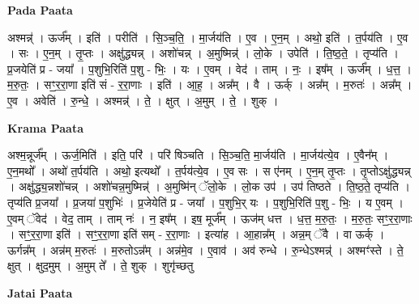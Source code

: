 \documentclass[17pt]{extarticle}
\begin{document}
\textbf{Pada Paata} \newline

अश्मन्न्॑ । ऊर्ज᳚म् । इति॑ । परीति॑ । सि॒ञ्च॒ति॒ । मा॒र्जय॑ति । ए॒व । ए॒न॒म् । अथो॒ इति॑ । त॒र्पय॑ति । ए॒व । सः । ए॒न॒म् । तृ॒प्तः । अक्षु॑द्ध्यन्न् । अशो॑चन्न् । अ॒मुष्मिन्न्॑ । लो॒के । उपेति॑ । ति॒ष्ठ॒ते॒ । तृप्य॑ति । प्र॒जयेति॑ प्र - जया᳚ । प॒शुभि॒रिति॑ प॒शु - भिः॒ । यः । ए॒वम् । वेद॑ । ताम् । नः॒ । इष᳚म् । ऊर्ज᳚म् । ध॒त्त॒ । म॒रु॒तः॒ । सꣳ॒॒र॒रा॒णा इति॑ सं - र॒रा॒णाः । इति॑ । आ॒ह॒ । अन्न᳚म् । वै । ऊर्क् । अन्न᳚म् । म॒रुतः॑ । अन्न᳚म् । ए॒व । अवेति॑ । रु॒न्धे॒ । अश्मन्न्॑ । ते॒ । क्षुत् । अ॒मुम् । ते॒ । शुक् ।  \newline


\textbf{Krama Paata} \newline

अश्म॒न्नूर्ज᳚म् । ऊर्ज॒मिति॑ । इति॒ परि॑ । परि॑ षिञ्चति । सि॒ञ्च॒ति॒ मा॒र्जय॑ति । मा॒र्जय॑त्ये॒व । ए॒वैन᳚म् । ए॒न॒मथो᳚ । अथो॑ त॒र्पय॑ति । अथो॒ इत्यथो᳚ । त॒र्पय॑त्ये॒व । ए॒व सः । स ए॑नम् । ए॒न॒म् तृ॒प्तः । तृ॒प्तोऽक्षु॑द्ध्यन्न् । अक्षु॑द्ध्य॒न्नशो॑चन्न् । अशो॑चन्न॒मुष्मिन्न्॑ । अ॒मुष्मि॑न् ॅलो॒के । लो॒क उप॑ । उप॑ तिष्ठते । ति॒ष्ठ॒ते॒ तृप्य॑ति । तृप्य॑ति प्र॒जया᳚ । प्र॒जया॑ प॒शुभिः॑ । प्र॒जेयेति॑ प्र - जया᳚ । प॒शुभि॒र् यः । प॒शुभि॒रिति॑ प॒शु - भिः॒ । य ए॒वम् । ए॒वम् ॅवेद॑ । वेद॒ ताम् । ताम् नः॑ । न॒ इष᳚म् । इष॒ मूर्ज᳚म् । ऊज॑म् धत्त । ध॒त्त॒ म॒रु॒तः॒ । म॒रु॒तः॒ सꣳ॒॒र॒रा॒णाः । सꣳ॒॒र॒रा॒णा इति॑ । सꣳ॒॒र॒रा॒णा इति॑ सम् - र॒रा॒णाः । इत्या॑ह । आ॒हान्न᳚म् । अन्न॒म् ॅवै । वा ऊर्क् । ऊर्गन्न᳚म् । अन्न॑म् म॒रुतः॑ । म॒रुतोऽन्न᳚म् । अन्न॑मे॒व । ए॒वाव॑ । अव॑ रुन्धे । रु॒न्धेऽश्मन्न्॑ । अश्मꣳ॑स्ते । ते॒ क्षुत् । क्षुद॒मुम् । अ॒मुम् ते᳚ । ते॒ शुक् । शुगृ॑च्छतु \newline

\textbf{Jatai Paata} \newline
\end{document}
